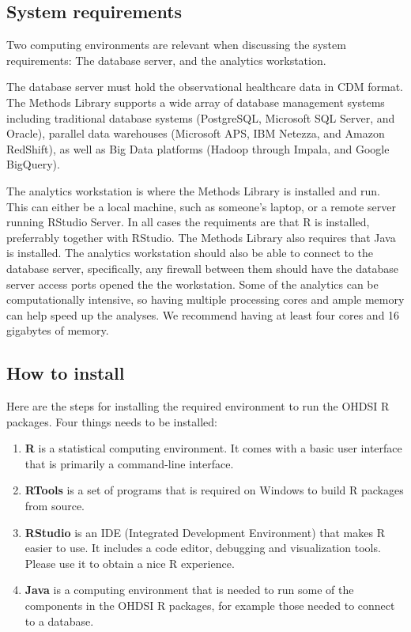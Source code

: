 \documentclass[11pt]{book}
\providecommand{\tightlist}{%
  \setlength{\itemsep}{0pt}\setlength{\parskip}{0pt}}
\begin{document}
\subsection{System requirements}\label{system-requirements-1}

Two computing environments are relevant when discussing the system
requirements: The database server, and the analytics workstation.

The database server must hold the observational healthcare data in CDM
format. The Methods Library supports a wide array of database management
systems including traditional database systems (PostgreSQL, Microsoft
SQL Server, and Oracle), parallel data warehouses (Microsoft APS, IBM
Netezza, and Amazon RedShift), as well as Big Data platforms (Hadoop
through Impala, and Google BigQuery).

The analytics workstation is where the Methods Library is installed and
run. This can either be a local machine, such as someone's laptop, or a
remote server running RStudio Server. In all cases the requiments are
that R is installed, preferrably together with RStudio. The Methods
Library also requires that Java is installed. The analytics workstation
should also be able to connect to the database server, specifically, any
firewall between them should have the database server access ports
opened the the workstation. Some of the analytics can be computationally
intensive, so having multiple processing cores and ample memory can help
speed up the analyses. We recommend having at least four cores and 16
gigabytes of memory.

\subsection{How to install}\label{how-to-install-1}

Here are the steps for installing the required environment to run the
OHDSI R packages. Four things needs to be installed:

\begin{enumerate}
\def\labelenumi{\arabic{enumi}.}
\tightlist
\item
  \textbf{R} is a statistical computing environment. It comes with a
  basic user interface that is primarily a command-line interface.
\item
  \textbf{RTools} is a set of programs that is required on Windows to
  build R packages from source.
\item
  \textbf{RStudio} is an IDE (Integrated Development Environment) that
  makes R easier to use. It includes a code editor, debugging and
  visualization tools. Please use it to obtain a nice R experience.
\item
  \textbf{Java} is a computing environment that is needed to run some of
  the components in the OHDSI R packages, for example those needed to
  connect to a database.
\end{enumerate}
\end{document}
